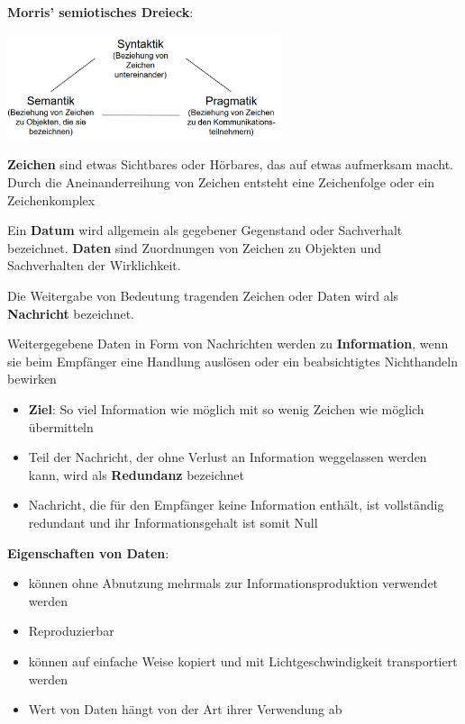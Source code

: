 \textbf{Morris’ semiotisches Dreieck}:
\begin{center}
	\includegraphics[width=0.6\textwidth]{images/semiotisches Dreieck.png}
\end{center}

\textbf{Zeichen} sind etwas Sichtbares oder Hörbares, das auf etwas aufmerksam macht. Durch die Aneinanderreihung von Zeichen entsteht eine Zeichenfolge oder ein Zeichenkomplex

Ein \textbf{Datum} wird allgemein als gegebener Gegenstand oder Sachverhalt bezeichnet. \textbf{Daten} sind Zuordnungen von Zeichen zu Objekten und Sachverhalten der Wirklichkeit.

Die Weitergabe von Bedeutung tragenden Zeichen oder Daten wird als \textbf{Nachricht} bezeichnet.

Weitergegebene Daten in Form von Nachrichten werden zu \textbf{Information}, wenn sie beim Empfänger eine Handlung auslösen oder ein beabsichtigtes Nichthandeln bewirken
\begin{itemize}
	\item \textbf{Ziel}: So viel Information wie möglich mit so wenig Zeichen wie möglich übermitteln
	\item Teil der Nachricht, der ohne Verlust an Information weggelassen werden kann, wird als \textbf{Redundanz} bezeichnet
	\item Nachricht, die für den Empfänger keine Information enthält, ist vollständig redundant und ihr Informationsgehalt ist somit Null
\end{itemize}

\textbf{Eigenschaften von Daten}:
\begin{itemize}
	\item können ohne Abnutzung mehrmals zur Informationsproduktion verwendet werden
	\item Reproduzierbar
	\item können auf einfache Weise kopiert und mit Lichtgeschwindigkeit transportiert werden
	\item Wert von Daten hängt von der Art ihrer Verwendung ab
\end{itemize}

